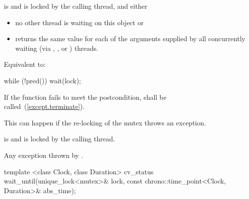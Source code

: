 \begin{itemdescr}
\pnum
\requires {} is  and  is
locked by the calling thread, and either

\begin{itemize}
\item no other thread is waiting on this  object or
\item {} returns the same value for each of the 
arguments supplied by all concurrently waiting (via ,
, or ) threads.
\end{itemize}

\pnum
\effects Equivalent to:
\begin{codeblock}
while (!pred())
  wait(lock);
\end{codeblock}

\pnum
\remarks
If the function fails to meet the postcondition, 
shall be called~(\ref{except.terminate}).
\begin{note} This can happen if the re-locking of the mutex throws an exception. \end{note}

\pnum
\postcondition {} is  and 
is locked by the calling thread.

\pnum
\throws Any exception thrown by .

\end{itemdescr}

%
%
\begin{itemdecl}
template <class Clock, class Duration>
  cv_status wait_until(unique_lock<mutex>& lock,
                       const chrono::time_point<Clock, Duration>& abs_time);
\end{itemdecl}

